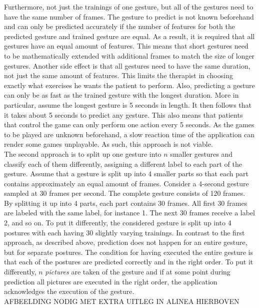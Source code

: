 Furthermore, not just the trainings of one gesture, but all of the gestures need to have the same number of frames. The gesture to predict is not known beforehand and can only be predicted accurately if the number of features for both the predicted gesture and trained gesture are equal. As a result, it is required that all gestures have an equal amount of features. This means that short gestures need to be mathematically extended with additional frames to match the size of longer gestures. Another side effect is that all gestures need to have the same duration, not just the same amount of features. This limits the therapist in choosing exactly what exercises he wants the patient to perform. Also, predicting a gesture can only be as fast as the trained gesture with the longest duration. More in particular, assume the longest gesture is 5 seconds in length. It then follows that it takes about 5 seconds to predict any gesture. This also means that patients that control the game can only perform one action every 5 seconds. As the games to be played are unknown beforehand, a slow reaction time of the application can render some games unplayable. As such, this approach is not viable.\\

The second approach is to split up one gesture into $n$ smaller gestures and classify each of them differently, assigning a different label to each part of the gesture. Assume that a gesture is split up into 4 smaller parts so that each part contains approximately an equal amount of frames. Consider a 4-second gesture sampled at 30 frames per second. The complete gesture consists of 120 frames. By splitting it up into 4 parts, each part contains 30 frames. All first 30 frames are labeled with the same label, for instance 1. The next 30 frames receive a label 2, and so on. To put it differently, the considered gesture is split up into 4 postures with each having 30 slightly varying trainings. In contrast to the first approach, as described above, prediction does not happen for an entire gesture, but for separate postures. The condition for having executed the entire gesture is that each of the postures are predicted correctly and in the right order. To put it differently, $n$ \emph{pictures} are taken of the gesture and if at some point during prediction all pictures are executed in the right order, the application acknowledges the execution of the gesture.\\

AFBEELDING NODIG MET EXTRA UITLEG IN ALINEA HIERBOVEN\\


